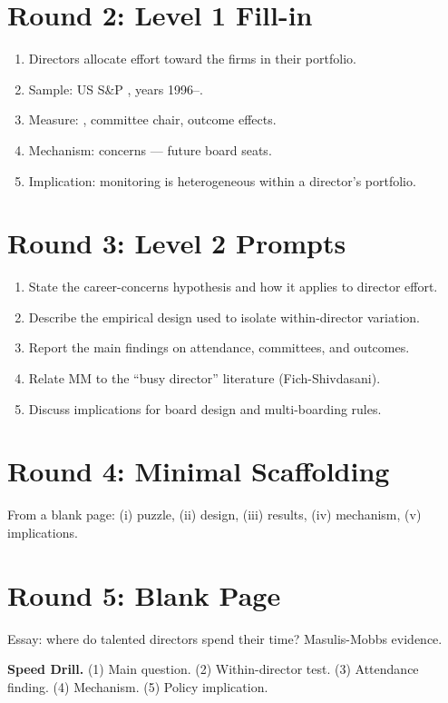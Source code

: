 \documentclass[11pt]{article}
\newcommand{\blank}[1]{\underline{\hspace{#1}}}
\begin{document}
\section*{Round 2: Level 1 Fill-in}
\begin{enumerate}
\item Directors allocate effort toward the \blank{2cm} firms in their portfolio.
\item Sample: US S\&P \blank{1cm}, years 1996--\blank{1cm}.
\item Measure: \blank{2cm}, committee chair, outcome effects.
\item Mechanism: \blank{2cm} concerns --- future board seats.
\item Implication: monitoring \blank{2cm} is heterogeneous within a director's portfolio.
\end{enumerate}

\section*{Round 3: Level 2 Prompts}
\begin{enumerate}
\item State the career-concerns hypothesis and how it applies to director effort.
\item Describe the empirical design used to isolate within-director variation.
\item Report the main findings on attendance, committees, and outcomes.
\item Relate MM to the ``busy director'' literature (Fich-Shivdasani).
\item Discuss implications for board design and multi-boarding rules.
\end{enumerate}

\section*{Round 4: Minimal Scaffolding}
From a blank page: (i) puzzle, (ii) design, (iii) results, (iv) mechanism, (v) implications.

\section*{Round 5: Blank Page}
Essay: where do talented directors spend their time? Masulis-Mobbs evidence.

\vspace{6pt}
\begin{drillbox}
\textbf{Speed Drill.} (1) Main question. (2) Within-director test. (3) Attendance finding. (4) Mechanism. (5) Policy implication.
\end{drillbox}
\end{document}
